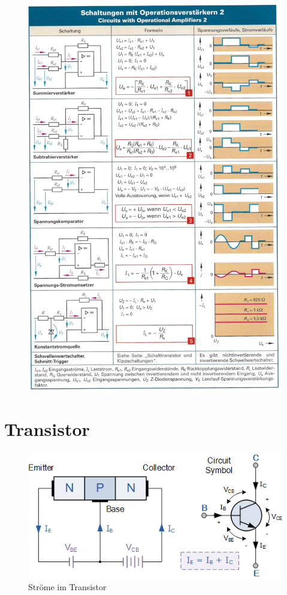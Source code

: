 \documentclass[a5paper, 12pt]{scrartcl}
\begin{document}
\begin{figure}[H]
  \centering
  \includegraphics[width=.95\textwidth]{OPV2}
\end{figure}

\section{Transistor}

\begin{figure}[H]
  \centering
  \includegraphics[width=.6\textwidth]{Transistor}
  \caption{Ströme im Transistor}
\end{figure}
\end{document}
